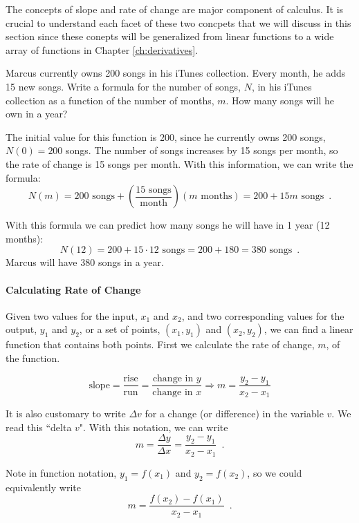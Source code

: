 The concepts of slope and rate of change are major component of calculus. It is crucial to understand each facet of these two concpets that we will discuss in this section since these conepts will be generalized from linear functions to a wide array of functions in Chapter \ref{ch:derivatives}.

\begin{example}
Marcus currently owns 200 songs in his iTunes collection. Every month, he adds 15 new songs. Write a formula for the number of songs, $N$, in his iTunes collection as a function of the number of months, $m$. How many songs will he own in a year?

\begin{solution} The initial value for this function is 200, since he currently owns 200 songs, $N(0)=200$ songs. The number of songs increases by 15 songs per month, so the rate of change is 15 songs per month. With this information, we can write the formula:
$$N(m) = 200 \mbox{ songs} + \left(\frac{15\mbox{ songs}}{\mbox{month}}\right)(m \mbox{ months}) = 200 + 15m \mbox{ songs} \enspace .$$

With this formula we can predict how many songs he will have in 1 year (12 months):
$$N(12) = 200 + 15\cdot 12\mbox{ songs}  = 200 + 180 = 380 \mbox{ songs}  \enspace .$$
Marcus will have 380 songs in a year.
\end{solution}\end{example}


\paragraph{Calculating Rate of Change}

Given two values for the input, $x_1$ and $x_2$, and two corresponding values for the output, $y_1$ and $y_2$, or a set of points, $(x_1, y_1)$ and $(x_2, y_2)$, we can find a linear function that contains both points. First we calculate the rate of change, $m$, of the function.

$$\mbox{slope}=\frac{\mbox{rise}}{\mbox{run}}=\frac{\mbox{change in } y}{\mbox{change in } x} \Rightarrow m = \frac{y_2-y_1}{x_2-x_1}$$

It is also customary to write $\Delta v$ for a change (or difference) in the variable $v$. We read this ``delta $v$". With this notation, we can write
$$m=\frac{\Delta y }{\Delta x} = \frac{y_2-y_1}{x_2-x_1}\enspace .$$

Note in function notation, $y_1 = f(x_1)$ and $y_2 = f(x_2)$, so we could equivalently write
$$m=\frac{f(x_2)-f(x_1)}{x_2-x_1}\enspace .$$

